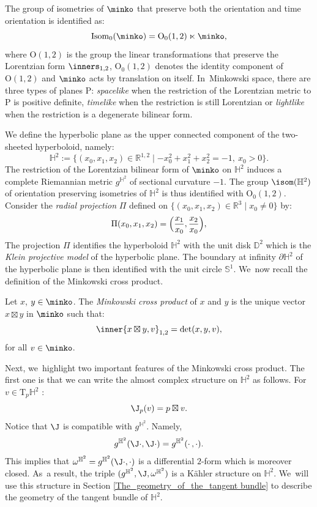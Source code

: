 The group of isometries of $\minko$ that preserve both the orientation and time orientation is identified as:
\[
\mathrm{Isom}_0(\minko)=\mathrm{O}_0(1,2)\ltimes\minko,
\]
where $\mathrm{O}(1,2)$ is the group the linear transformations that preserve the Lorentzian form $\inners_{1,2}$, $\mathrm{O}_0(1,2)$ denotes the identity component of $\mathrm{O}(1,2)$ and $\minko$ acts by translation on itself. In~Minkowski space, there are three types of planes $\mathrm{P}$: \emph{spacelike} when the restriction of the Lorentzian metric to $\mathrm{P}$ is positive definite, \emph{timelike} when the restriction is still Lorentzian or \emph{lightlike} when the restriction is a degenerate bilinear form.

We define the hyperbolic plane as the upper connected component of the two-sheeted hyperboloid,
namely:
\begin{equation}\label{hyperboloid}
\mathbb{H}^2:=\{(x_0,x_1,x_2)\in \mathbb{R}^{1,2}\mid -x_0^2+x_1^2+x_2^2=-1, \ x_0>0\}.
\end{equation}
The restriction of the Lorentzian bilinear form of $\minko$ on $\mathbb{H}^2$ induces a complete Riemannian metric $g^{\mathbb{H}^2}$ of sectional curvature $-1$. The group $\isom(\mathbb{H}^2)$ of orientation preserving isometries of $\mathbb{H}^2$ is thus identified with $\mathrm{O}_0(1,2)$. Consider the \emph{radial projection} $\Pi$ defined on $\{(x_0,x_1,x_2)\in\mathbb{R}^3\mid x_0\neq 0\}$ by:
\begin{equation}\label{radial}
\Pi(x_0,x_1,x_2)=\Bigl(\frac{x_1}{x_0},\frac{x_2}{x_0} \Bigr),
\end{equation}
The projection $\Pi$ identifies the hyperboloid $\mathbb{H}^2$ with the unit disk $\mathbb{D}^2$ which is the \emph{Klein projective model} of the hyperbolic plane. The boundary at infinity $\partial\mathbb{H}^2$ of the hyperbolic plane is then identified with the unit circle $\mathbb{S}^1$. We~now recall the definition of the Minkowski cross product.
\begin{defi}
Let $x$, $y\in \minko$. The \emph{Minkowski cross product} of $x$ and $y$ is the unique vector $x\boxtimes y$ in $\minko$ such that:
\[
\inner{x\boxtimes y,v}_{1,2}=\det(x,y,v),
\]
for all $v\in \minko$.
\end{defi}
Next, we~highlight two important features of the Minkowski cross product. The first one is that we can write the almost complex structure on $\mathbb{H}^2$ as follows. For $v\in\mathrm{T}_p\mathbb{H}^2$ :
\begin{equation}\label{complex_structure_H2}
\J_p(v)=p\boxtimes v.
\end{equation}
Notice that $\J$ is compatible with $g^{\mathbb{H}^2}$. Namely,
\[
g^{\mathbb{H}^2}(\J\cdot,\J\cdot)=g^{\mathbb{H}^2}(\cdot\,,\cdot).
\]
This implies that $\omega^{\mathbb{H}^2}=g^{\mathbb{H}^2}(\J\cdot,\cdot)$ is a differential $2$-form which is moreover closed. As~a result, the triple $(g^{\mathbb{H}^2}, \J, \omega^{\mathbb{H}^2})$ is a Kähler structure on $\mathbb{H}^2$. We~will use this structure in Section \ref{The_geometry_of_the_tangent bundle} to describe the geometry of the tangent bundle of $\mathbb{H}^2$.

